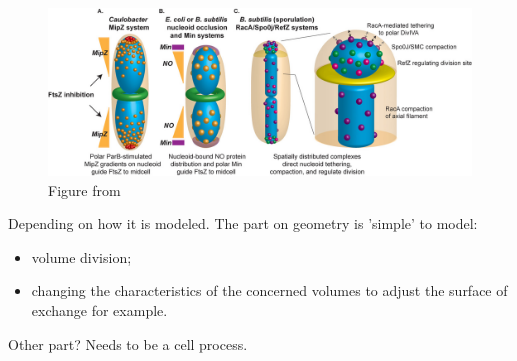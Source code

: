 
\begin{figure}[!ht]
	\centering
	\includegraphics[width=0.9\linewidth]{figure/cytokinesis}
	\caption{Figure from \citet{ptacin_chromosome_2013}}
	\label{fig:cytokinesis}
\end{figure}

\textcolor[rgb]{1.00,0.00,0.00}{Depending on how it is modeled. The part on geometry is 'simple' to model:
\begin{itemize}
  \item volume division;
  \item changing the characteristics of the concerned volumes to adjust the surface of exchange for example.
\end{itemize}
Other part? Needs to be a cell process.}